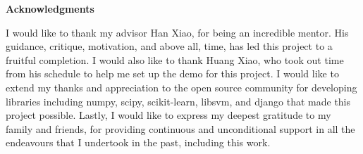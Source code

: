 \clearemptydoublepage
{}
{}	


\vspace*{2cm}

\begin{center}
{\Large \bf Acknowledgments}
\end{center}

\vspace{1cm}

I would like to thank my advisor Han Xiao, for being an incredible mentor. His guidance, critique, motivation, and above all, time, has led this project to a fruitful completion. I would also like to thank Huang Xiao, who took out time from his schedule to help me set up the demo for this project. I would like to extend my thanks and appreciation to the open source community for developing libraries including numpy, scipy, scikit-learn, libsvm, and django that made this project possible. Lastly, I would like to express my deepest gratitude to my family and friends, for providing continuous and unconditional support in all the endeavours that I undertook in the past, including this work.
